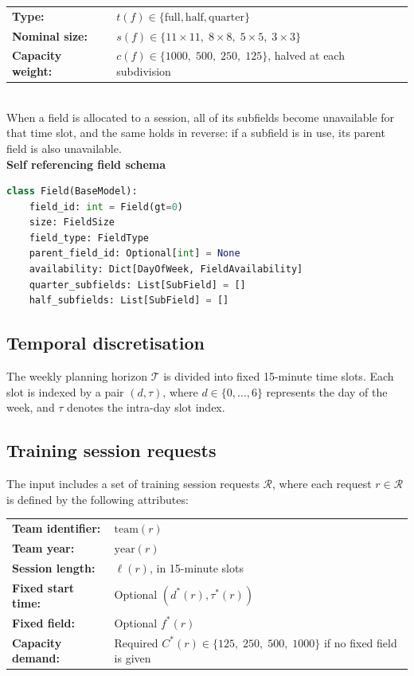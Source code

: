 \documentclass[12pt]{article}
\begin{document}
\begin{tabular}{@{}ll@{}}
\textbf{Type:} & $t(f) \in \{\text{full}, \text{half}, \text{quarter}\}$ \\
\textbf{Nominal size:} & $s(f) \in \{11 \times 11,\; 8 \times 8,\; 5 \times 5,\; 3 \times 3\}$ \\
\textbf{Capacity weight:} & $c(f) \in \{1000,\; 500,\; 250,\; 125\}$, halved at each subdivision \\
\end{tabular}
\\

When a field is allocated to a session, all of its subfields become unavailable for that time slot, and the same holds in reverse: if a subfield is in use, its parent field is also unavailable.
\\

\textbf{Self referencing field schema}
\begin{lstlisting}[language=Python]
class Field(BaseModel):
    field_id: int = Field(gt=0)
    size: FieldSize
    field_type: FieldType
    parent_field_id: Optional[int] = None
    availability: Dict[DayOfWeek, FieldAvailability]
    quarter_subfields: List[SubField] = []
    half_subfields: List[SubField] = []

\end{lstlisting}

\vspace{.5\baselineskip}
\subsection{Temporal discretisation}

The weekly planning horizon $\mathcal{T}$ is divided into fixed 15-minute time slots. Each slot is indexed by a pair $(d,\tau)$, where $d \in \{0, \dots, 6\}$ represents the day of the week, and $\tau$ denotes the intra-day slot index.

\subsection{Training session requests}

The input includes a set of training session requests $\mathcal{R}$, where each request $r \in \mathcal{R}$ is defined by the following attributes:
\\

\begin{tabular}{@{}ll@{}}
\textbf{Team identifier:} & $\mathrm{team}(r)$ \\
\textbf{Team year:} & $\mathrm{year}(r)$ \\
\textbf{Session length:} & $\ell(r)$, in 15-minute slots \\
\textbf{Fixed start time:} & Optional $(d^{\!*}(r), \tau^{\!*}(r))$ \\
\textbf{Fixed field:} & Optional $f^{\!*}(r)$ \\
\textbf{Capacity demand:} & Required $C^{\!*}(r) \in \{125,\; 250,\; 500,\; 1000\}$ if no fixed field is given \\
\end{tabular}
\\
\end{document}
